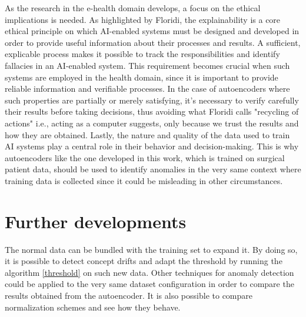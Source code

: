 \documentclass{article}
\begin{document}
\begin{multicols*}{2}
As the research in the e-health domain develops, a focus on the ethical implications is needed. As highlighted by Floridi, \cite{floridi2022etica} the explainability is a core ethical principle on which AI-enabled systems must be designed and developed in order to provide useful information about their processes and results. A sufficient, explicable process makes it possible to track the responsibilities and identify fallacies in an AI-enabled system. This requirement becomes crucial when such systems are employed in the health domain, since it is important to provide reliable information and verifiable processes. In the case of autoencoders where such properties are partially or merely satisfying, it's necessary to verify carefully their results before taking decisions, thus avoiding what Floridi calls "recycling of actions" i.e., acting as a computer suggests, only because we trust the results and how they are obtained.
Lastly, the nature and quality of the data used to train AI systems play a central role in their behavior and decision-making. This is why autoencoders like the one developed in this work, which is trained on surgical patient data, should be used to identify anomalies in the very same context where training data is collected since it could be misleading in other circumstances.


\section{Further developments}

The normal data can be bundled with the training set to expand it. By doing so, it is possible to detect concept drifts and adapt the threshold by running the algorithm \ref{threshold} on such new data.
Other techniques for anomaly detection could be applied to the very same dataset configuration in order to compare the results obtained from the autoencoder.
It is also possible to compare normalization schemes and see how they behave.
		
\nocite{*}
\printbibliography
		
		
	\end{multicols*}
	
\end{document}
